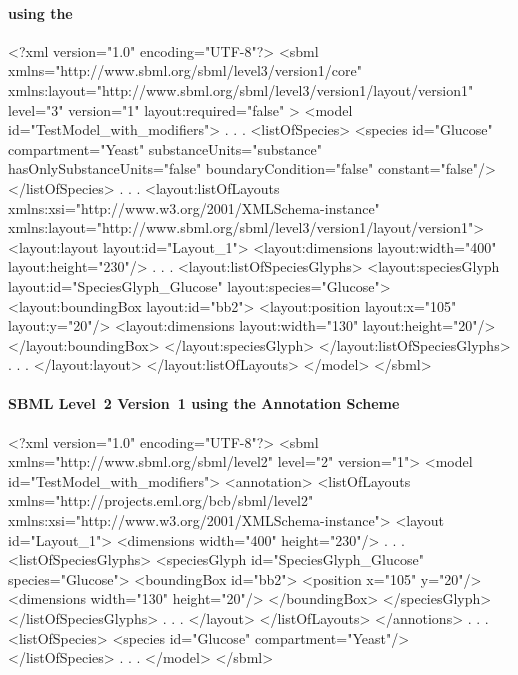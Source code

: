 \paragraph{\sbmlthreecore using the \LayoutPackage}
\begin{example}
<?xml version="1.0" encoding="UTF-8"?>
<sbml xmlns="http://www.sbml.org/sbml/level3/version1/core" 
		xmlns:layout="http://www.sbml.org/sbml/level3/version1/layout/version1" 
		level="3" version="1" layout:required="false" >		
  <model id="TestModel_with_modifiers">
                .
                .
                .
    <listOfSpecies>
      <species id="Glucose" compartment="Yeast" substanceUnits="substance" 
			hasOnlySubstanceUnits="false" boundaryCondition="false" constant="false"/>
    </listOfSpecies>
                .
                .
                .
    <layout:listOfLayouts xmlns:xsi="http://www.w3.org/2001/XMLSchema-instance" 
		xmlns:layout="http://www.sbml.org/sbml/level3/version1/layout/version1">
      <layout:layout layout:id="Layout_1">
        <layout:dimensions layout:width="400" layout:height="230"/>
                .
                .
                .
        <layout:listOfSpeciesGlyphs>
          <layout:speciesGlyph layout:id="SpeciesGlyph_Glucose"  layout:species="Glucose">
            <layout:boundingBox layout:id="bb2">
              <layout:position layout:x="105" layout:y="20"/>
              <layout:dimensions layout:width="130" layout:height="20"/>
            </layout:boundingBox>
          </layout:speciesGlyph>
        </layout:listOfSpeciesGlyphs>					
                .
                .
                .
			</layout:layout>
		</layout:listOfLayouts>
  </model>
</sbml>
\end{example}
\pagebreak
\paragraph{SBML Level~2 Version~1 using the Annotation Scheme}
\begin{example}
<?xml version="1.0" encoding="UTF-8"?>
<sbml xmlns="http://www.sbml.org/sbml/level2" level="2" version="1">
  <model id="TestModel_with_modifiers">
    <annotation>
     <listOfLayouts xmlns="http://projects.eml.org/bcb/sbml/level2"
              xmlns:xsi="http://www.w3.org/2001/XMLSchema-instance">
      <layout id="Layout_1">
        <dimensions width="400" height="230"/>
                .
                .
                .
        <listOfSpeciesGlyphs>
          <speciesGlyph id="SpeciesGlyph_Glucose" species="Glucose">
            <boundingBox id="bb2">
              <position x="105" y="20"/>
              <dimensions width="130" height="20"/>
            </boundingBox>
          </speciesGlyph>
        </listOfSpeciesGlyphs>  
            .
            .
            . 
       </layout>
      </listOfLayouts>
    </annotions>
         .
         .
         .
    <listOfSpecies>
      <species id="Glucose" compartment="Yeast"/>
    </listOfSpecies>
       .
       .
       .  
  </model>
</sbml>
\end{example}


